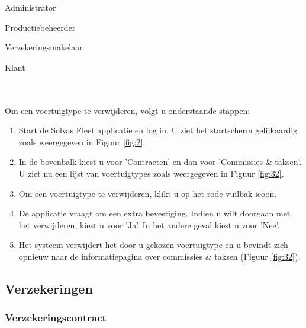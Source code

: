 \documentclass[11pt,openany]{article}
\newcommand{\cmark}{\ding{51}}%
\newcommand{\xmark}{\ding{55}}%
\newcommand{\done}{\rlap{$\square$}{\raisebox{2pt}{\large\hspace{1pt}\cmark}}%
	\hspace{-2.5pt}}
\newcommand{\wontfix}{\rlap{$\square$}{\large\hspace{1pt}\xmark}}
\begin{document}
\begin{todolist}
	\item[\done] Administrator
	\item[\done] Productiebeheerder
	\item[\done] Verzekeringsmakelaar
	\item[\wontfix] Klant 
\end{todolist}
\\
\\
Om een voertuigtype te verwijderen, volgt u onderstaande stappen:
\begin{enumerate}
	\item Start de Solvas Fleet applicatie en log in. U ziet het startscherm gelijkaardig zoals weergegeven in Figuur \ref{fig:2}.
	\item In de bovenbalk kiest u voor 'Contracten' en dan voor 'Commissies \& taksen'. U ziet nu een lijst van voertuigtypes zoals weergegeven in Figuur \ref{fig:32}.
	\item Om een voertuigtype te verwijderen, klikt u op het rode vuilbak icoon. 
	\item De applicatie vraagt om een extra bevestiging. Indien u wilt doorgaan met het verwijderen, kiest u voor 'Ja'. In het andere geval kiest u voor 'Nee'.
	\item Het systeem verwijdert het door u gekozen voertuigtype en u bevindt zich opnieuw naar de informatiepagina over commissies \& taksen (Figuur \ref{fig:32}).
\end{enumerate}




\subsection{Verzekeringen}
\label{insurances}
\subsubsection{Verzekeringscontract}
\label{contract}
\end{document}
